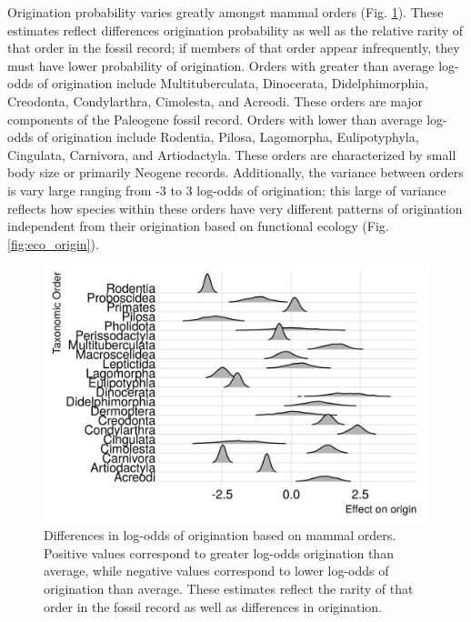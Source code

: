 \documentclass[12pt,letterpaper]{article}
\begin{document}
Origination probability varies greatly amongst mammal orders (Fig. \ref{fig:order_origin}). These estimates reflect differences origination probability as well as the relative rarity of that order in the fossil record; if members of that order appear infrequently, they must have lower probability of origination. Orders with greater than average log-odds of origination include Multituberculata, Dinocerata, Didelphimorphia, Creodonta, Condylarthra, Cimolesta, and Acreodi. These orders are major components of the Paleogene fossil record. Orders with lower than average log-odds of origination include Rodentia, Pilosa, Lagomorpha, Eulipotyphyla, Cingulata, Carnivora, and Artiodactyla. These orders are characterized by small body size or primarily Neogene records. Additionally, the variance between orders is vary large ranging from -3 to 3 log-odds of origination; this large of variance reflects how species within these orders have very different patterns of origination independent from their origination based on functional ecology (Fig. \ref{fig:eco_origin}).
\begin{figure}[ht]
  \centering
  \includegraphics[width=\textwidth,height=0.4\textheight,keepaspectratio=true]{figure/order_origin_bd}
  \caption{Differences in log-odds of origination based on mammal orders. Positive values correspond to greater log-odds origination than average, while negative values correspond to lower log-odds of origination than average. These estimates reflect the rarity of that order in the fossil record as well as differences in origination.}
  \label{fig:order_origin}
\end{figure}
\end{document}
